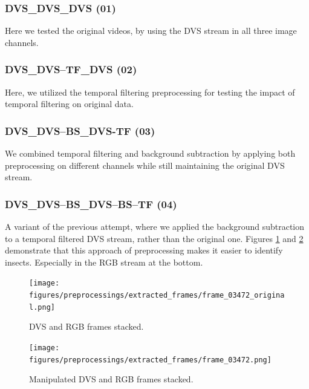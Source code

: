 \documentclass[sigchi,screen]{acmart}
\begin{document}
\subsubsection{DVS\_DVS\_DVS (01)}
Here we tested the original videos, by using the DVS stream in all three image channels.
\subsubsection{DVS\_DVS--TF\_DVS (02)}
Here, we utilized the temporal filtering preprocessing for testing the impact of temporal filtering on original data. 

\subsubsection{DVS\_DVS--BS\_DVS-TF (03)}
We combined temporal filtering and background subtraction by applying both preprocessing on different channels while still maintaining the original DVS stream.
\subsubsection{DVS\_DVS--BS\_DVS--BS--TF (04)}
A variant of the previous attempt, where we applied the background subtraction to a temporal filtered DVS stream, rather than the original one. Figures \ref{fig:frame-comparison-original} and \ref{fig:frame-comparison-manipulated} demonstrate that this approach of preprocessing makes it easier to identify insects. Especially in the RGB stream at the bottom.

\begin{figure}[htbp] %
    \centering %
    \texttt{[image: figures/preprocessings/extracted\_frames/frame\_03472\_original.png]} %
    \caption{DVS and RGB frames stacked.} %
    \label{fig:frame-comparison-original} %
\end{figure}

\begin{figure}[htbp] %
    \centering %
    \texttt{[image: figures/preprocessings/extracted\_frames/frame\_03472.png]} %
    \caption{Manipulated DVS and RGB frames stacked.} %
    \label{fig:frame-comparison-manipulated} %
\end{figure}
\end{document}
